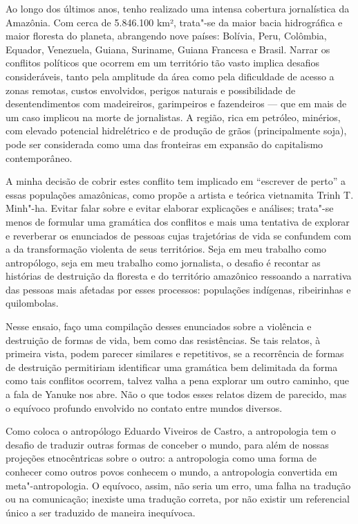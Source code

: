 \asterisc

Ao longo dos últimos anos, tenho realizado uma intensa cobertura
jornalística da Amazônia. Com cerca de 5.846.100 km², trata"-se da maior
bacia hidrográfica e maior floresta do planeta, abrangendo nove países:
Bolívia, Peru, Colômbia, Equador, Venezuela, Guiana, Suriname, Guiana
Francesa e Brasil. Narrar os conflitos políticos que ocorrem em um
território tão vasto implica desafios consideráveis, tanto pela
amplitude da área como pela dificuldade de acesso a zonas remotas,
custos envolvidos, perigos naturais e possibilidade de desentendimentos
com madeireiros, garimpeiros e fazendeiros --- que em mais de um caso
implicou na morte de jornalistas. A região, rica em petróleo, minérios,
com elevado potencial hidrelétrico e de produção de grãos
(principalmente soja), pode ser considerada como uma das fronteiras em
expansão do capitalismo contemporâneo.

A minha decisão de cobrir estes conflito tem implicado em ``escrever de
perto'' a essas populações amazônicas, como propõe a artista e teórica
vietnamita Trinh T. Minh"-ha. Evitar falar sobre e evitar elaborar
explicações e análises; trata"-se menos de formular uma gramática dos
conflitos e mais uma tentativa de explorar e reverberar os enunciados de
pessoas cujas trajetórias de vida se confundem com a da transformação
violenta de seus territórios. Seja em meu trabalho como antropólogo,
seja em meu trabalho como jornalista, o desafio é recontar as histórias
de destruição da floresta e do território amazônico ressoando a
narrativa das pessoas mais afetadas por esses processos:
populações indígenas, ribeirinhas e quilombolas.

Nesse ensaio, faço uma compilação desses enunciados sobre a violência e
destruição de formas de vida, bem como das resistências. Se tais relatos, à primeira vista,
podem parecer similares e repetitivos, se a recorrência de formas de
destruição permitiriam identificar uma gramática bem delimitada da
forma como tais conflitos ocorrem, talvez valha a pena explorar um outro
caminho, que a fala de Yanuke nos abre. Não o que todos esses relatos
dizem de parecido, mas o equívoco profundo envolvido no contato entre
mundos diversos.

Como coloca o antropólogo Eduardo Viveiros de Castro, a antropologia tem
o desafio de traduzir outras formas de conceber o mundo, para além de
nossas projeções etnocêntricas sobre o outro: a antropologia como uma
forma de conhecer como outros povos conhecem o mundo, a antropologia
convertida em meta"-antropologia. O equívoco, assim, não seria um erro,
uma falha na tradução ou na comunicação; inexiste uma tradução correta,
por não existir um referencial único a ser traduzido de maneira
inequívoca.

